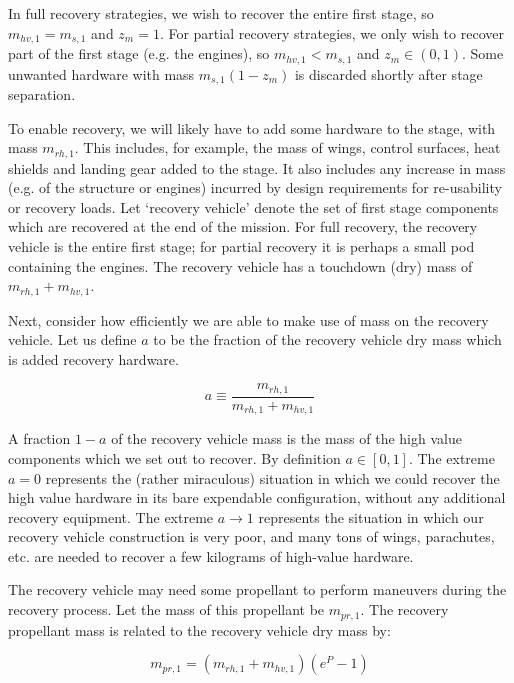 \documentclass[conf]{new-aiaa}
\begin{document}
In full recovery strategies, we wish to recover the entire first stage, so $m_{hv,1} = m_{s,1}$ and $z_m=1$. For partial recovery strategies, we only wish to recover part of the first stage (e.g. the engines), so $m_{hv,1} < m_{s,1}$ and $z_m \in (0, 1)$. Some unwanted hardware with mass $m_{s,1}(1 - z_m)$ is discarded shortly after stage separation.

To enable recovery, we will likely have to add some hardware to the stage, with mass $m_{rh,1}$. This includes, for example, the mass of wings, control surfaces, heat shields and landing gear added to the stage. It also includes any increase in mass (e.g. of the structure or engines) incurred by design requirements for re-usability or recovery loads. Let `recovery vehicle' denote the set of first stage components which are recovered at the end of the mission. For full recovery, the recovery vehicle is the entire first stage; for partial recovery it is perhaps a small pod containing the engines. The recovery vehicle has a touchdown (dry) mass of $m_{rh,1} + m_{hv,1}$.

Next, consider how efficiently we are able to make use of mass on the recovery vehicle. Let us define $a$ to be the fraction of the recovery vehicle dry mass which is added recovery hardware.

\begin{equation}
a \equiv \frac{m_{rh,1}}{m_{rh,1} + m_{hv,1}}
\end{equation}

A fraction $1-a$ of the recovery vehicle mass is the mass of the high value components which we set out to recover. By definition $a \in [0, 1]$. The extreme $a=0$ represents the (rather miraculous) situation in which we could recover the high value hardware in its bare expendable configuration, without any additional recovery equipment. The extreme $a \rightarrow 1$ represents the situation in which our recovery vehicle construction is very poor, and many tons of wings, parachutes, etc. are needed to recover a few kilograms of high-value hardware.

The recovery vehicle may need some propellant to perform maneuvers during the recovery process. Let the mass of this propellant be $m_{pr,1}$. The recovery propellant mass is related to the recovery vehicle dry mass by:

\begin{equation}
m_{pr,1} = (m_{rh,1} + m_{hv,1}) \left( e^P - 1 \right)
\end{equation}
\end{document}
